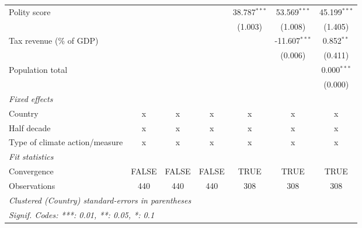 \begin{tabular}{lcccccc}
   Polity score                                             &         &                &                & 38.787$^{***}$  & 53.569$^{***}$  & 45.199$^{***}$\\   
                                                            &         &                &                & (1.003)         & (1.008)         & (1.405)\\   
   Tax revenue (\% of GDP)                                  &         &                &                &                 & -11.607$^{***}$ & 0.852$^{**}$\\   
                                                            &         &                &                &                 & (0.006)         & (0.411)\\   
   Population total                                         &         &                &                &                 &                 & 0.000$^{***}$\\   
                                                            &         &                &                &                 &                 & (0.000)\\   
   \emph{Fixed effects}\\
   Country                                                  & x       & x              & x              & x               & x               & x\\  
   Half decade                                              & x       & x              & x              & x               & x               & x\\  
   Type of climate action/measure                           & x       & x              & x              & x               & x               & x\\  
   \midrule \emph{Fit statistics}\\
   Convergence                                              &FALSE    & FALSE          & FALSE          & TRUE            & TRUE            & TRUE\\  
   Observations                                             & 440     & 440            & 440            & 308             & 308             & 308\\  
   \midrule
   \multicolumn{7}{l}{\emph{Clustered (Country) standard-errors in parentheses}}\\
   \multicolumn{7}{l}{\emph{Signif. Codes: ***: 0.01, **: 0.05, *: 0.1}}\\
\end{tabular}
\par\endgroup



